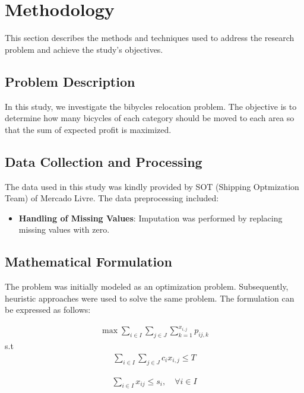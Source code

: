 \documentclass[]{article}
\begin{document}
\section{Methodology}

This section describes the methods and techniques used to address the research problem and achieve the study's objectives.

\subsection{Problem Description}

In this study, we investigate the bibycles relocation problem. The objective is to determine how many bicycles of each category should be moved to each area so that the sum of expected profit is maximized.

\subsection{Data Collection and Processing}
The data used in this study was kindly provided by SOT (Shipping Optmization Team) of Mercado Livre. The data preprocessing included:

\begin{itemize}
	\item \textbf{Handling of Missing Values}: Imputation was performed by replacing missing values with zero.
\end{itemize}

\subsection{Mathematical Formulation}

The problem was initially modeled as an optimization problem. Subsequently, heuristic approaches were used to solve the same problem. The formulation can be expressed as follows:

\begin{align}
	\max \sum_{i \in I} \sum_{j \in J} \sum_{k=1}^{x_{i,j}} p_{ij,k}
\end{align}
\qquad \qquad \qquad \qquad \qquad s.t
\begin{align}
	\sum_{i \in I} \sum_{j \in J} c_i x_{i,j} \leq T
\end{align}

\begin{align}
	\sum_{i \in I} x_{ij} \leq s_i, \quad \forall i \in I
\end{align}
\end{document}
